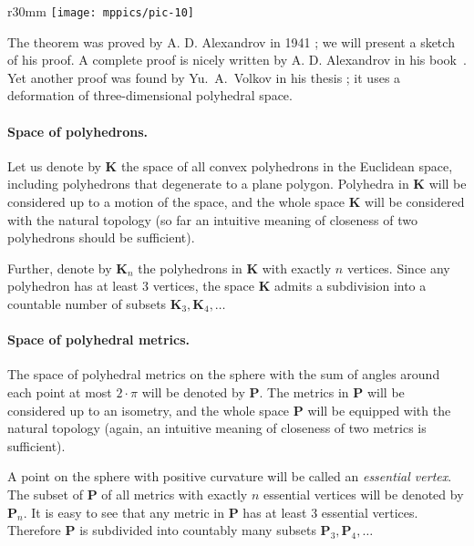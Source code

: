 {

\begin{wrapfigure}{r}{30mm}
\vskip-0mm
\centering
\texttt{[image: mppics/pic-10]}
\vskip-0mm
\end{wrapfigure}

The theorem was proved by A. D. Alexandrov in 1941 \cite{alexandrov-1941};
we will present a sketch of his proof.
A complete proof is nicely written by A. D. Alexandrov in his book~\cite{alexandrov}.
Yet another proof was found by Yu.~A.~Volkov in his thesis \cite{volkov};
it uses a deformation of three-dimensional polyhedral space.

}

\paragraph{Space of polyhedrons.}
Let us denote by $\mathbf{K}$ the space of all convex polyhedrons in the Euclidean space,
including polyhedrons that degenerate to a plane polygon.
Polyhedra in $\mathbf{K}$ will be considered up to a motion of the space, 
and the whole space $\mathbf{K}$ will be considered with the natural topology (so far an intuitive meaning of closeness of two polyhedrons should be sufficient). 

Further, denote by $\mathbf{K}_n$ the polyhedrons in $\mathbf{K}$ with exactly $n$ vertices.
Since any polyhedron has at least 3 vertices, the space $\mathbf{K}$ admits a subdivision into a countable number of subsets $\mathbf{K}_3,\mathbf{K}_4,\dots$

\paragraph{Space of polyhedral metrics.}
The space of polyhedral metrics on the sphere with the sum of angles around each point at most $2\cdot\pi$ will be denoted by $\mathbf{P}$.
The metrics in $\mathbf{P}$ will be considered up to an isometry, and the whole space $\mathbf{P}$ will be equipped with the natural topology (again, an intuitive meaning of closeness of two metrics is sufficient).

A point on the sphere with positive curvature will be called an \emph{essential vertex}.
The subset of $\mathbf{P}$ of all metrics with exactly $n$ essential vertices will be denoted by $\mathbf{P}_n$.
It is easy to see that any metric in $\mathbf{P}$ has at least 3 essential vertices.
Therefore $\mathbf{P}$ is subdivided into countably many subsets
 $\mathbf{P}_3,\mathbf{P}_4,\dots$


